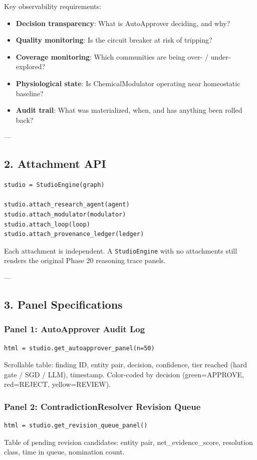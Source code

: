 Key obser\-vability requi\-rements:
\begin{itemize}
\item \textbf{Decision trans\-parency}: What is AutoApprover deciding, and why?
\item \textbf{Quality monitoring}: Is the circuit breaker at risk of tripping?
\item \textbf{Coverage monitoring}: Which communities are being over- / under-explored?
\item \textbf{Physio\-logical state}: Is ChemicalModulator operating near homeostatic baseline?
\item \textbf{Audit trail}: What was mater\-ialized, when, and has anything been rolled back?

\end{itemize}
---

\subsection{2. Attachment API}

\begin{lstlisting}
studio = StudioEngine(graph)

studio.attach_research_agent(agent)
studio.attach_modulator(modulator)
studio.attach_loop(loop)
studio.attach_provenance_ledger(ledger)
\end{lstlisting}

Each attachment is independent. A \texttt{StudioEngine} with no attachments still renders the original Phase 20 reasoning trace panels.

---

\subsection{3. Panel Specif\-ications}

\subsubsection{Panel 1: AutoApprover Audit Log}
\begin{lstlisting}
html = studio.get_autoapprover_panel(n=50)
\end{lstlisting}
Scrollable table: finding ID, entity pair, decision, confidence, tier reached (hard gate / SGD / LLM), timestamp. Color-coded by decision (green=APPROVE, red=REJECT, yellow=REVIEW).

\subsubsection{Panel 2: Contra\-dictionResolver Revision Queue}
\begin{lstlisting}
html = studio.get_revision_queue_panel()
\end{lstlisting}
Table of pending revision candidates: entity pair, net\_evidence\_score, resolution class, time in queue, nomination count.

